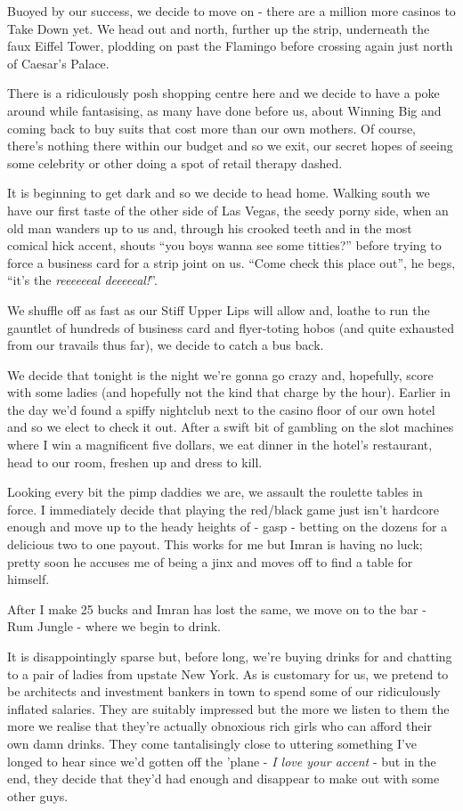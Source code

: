 \documentclass[a5paper,titlepage,11pt]{book}
\begin{document}
Buoyed by our success, we decide to move on - there are a million more casinos to Take Down yet. We head out and north, further up the strip, underneath the faux Eiffel Tower, plodding on past the Flamingo before crossing again just north of Caesar's Palace.

There is a ridiculously posh shopping centre here and we decide to have a poke around while fantasising, as many have done before us, about Winning Big and coming back to buy suits that cost more than our own mothers. Of course, there's nothing there within our budget and so we exit, our secret hopes of seeing some celebrity or other doing a spot of retail therapy dashed.

It is beginning to get dark and so we decide to head home. Walking south we have our first taste of the other side of Las Vegas, the seedy porny side, when an old man wanders up to us and, through his crooked teeth and in the most comical hick accent, shouts ``you boys wanna see some titties?'' before trying to force a business card for a strip joint on us. ``Come check this place out'', he begs, ``it's the \emph{reeeeeeal deeeeeal!}''. 

We shuffle off as fast as our Stiff Upper Lips will allow and, loathe to run the gauntlet of hundreds of business card and flyer-toting hobos (and quite exhausted from our travails thus far), we decide to catch a bus back.

We decide that tonight is the night we're gonna go crazy and, hopefully, score with some ladies (and hopefully not the kind that charge by the hour). Earlier in the day we'd found a spiffy nightclub next to the casino floor of our own hotel and so we elect to check it out. After a swift bit of gambling on the slot machines where I win a magnificent five dollars, we eat dinner in the hotel's restaurant, head to our room, freshen up and dress to kill.

Looking every bit the pimp daddies we are, we assault the roulette tables in force. I immediately decide that playing the red/black game just isn't hardcore enough and move up to the heady heights of - gasp - betting on the dozens for a delicious two to one payout. This works for me but Imran is having no luck; pretty soon he accuses me of being a jinx and moves off to find a table for himself.

After I make 25 bucks and Imran has lost the same, we move on to the bar - Rum Jungle - where we begin to drink.

It is disappointingly sparse but, before long, we're buying drinks for and chatting to a pair of ladies from upstate New York. As is customary for us, we pretend to be architects and investment bankers in town to spend some of our ridiculously inflated salaries. They are suitably impressed but the more we listen to them the more we realise that they're actually obnoxious rich girls who can afford their own damn drinks. They come tantalisingly close to uttering something I've longed to hear since we'd gotten off the 'plane - \emph{I love your accent} - but in the end, they decide that they'd had enough and disappear to make out with some other guys.
\end{document}
